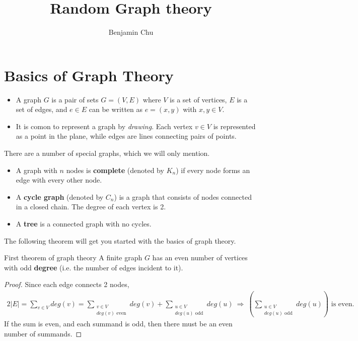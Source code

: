 \documentclass[./some_latex_template.tex]{subfiles}
\begin{document}
\title{Random Graph theory}
\author{Benjamin Chu}
\maketitle

\singlespacing

\section{Basics of Graph Theory}

\begin{itemize}
	\item A graph $G$ is a pair of sets $G = (V, E)$ where $V$ is a set of vertices, $E$ is a set of edges, and $e \in E$ can be written as $e = (x, y)$ with $x, y \in V$. 
	\item It is comon to represent a graph by \textit{drawing}. Each vertex $v \in V$ is represented as a point in the plane, while edges are lines connecting pairs of points. 
\end{itemize}

\noindent There are a number of special graphs, which we will only mention. 
\begin{itemize}
	\item A graph with $n$ nodes is \textbf{complete} (denoted by $K_n$) if every node forms an edge with every other node. 
	\item A \textbf{cycle graph} (denoted by $C_n$) is a graph that consists of nodes connected in a closed chain. The degree of each vertex is 2. 
	\item A \textbf{tree} is a connected graph with no cycles. 
\end{itemize}

\noindent The following theorem will get you started with the basics of graph theory.

\begin{theorembox}{First theorem of graph theory}{}
A finite graph $G$ has an even number of vertices with odd \textbf{degree} (i.e. the number of edges incident to it).
\end{theorembox}

\begin{proof}
Since each edge connects 2 nodes, 
\begin{align*}
	2|E| = 	\sum_{v \in V} deg(v) = \sum_{\substack{v \in V\\ deg(v) \text{ even}}} deg(v) + \sum_{\substack{u \in V\\ deg(u) \text{ odd}}} deg(u) \ \Longrightarrow \ \left(\sum_{\substack{u \in V\\ deg(u) \text{ odd}}} deg(u)\right) \text{ is even.}
\end{align*}
If the sum is even, and each summand is odd, then there must be an even number of summands.
\end{proof}
\end{document}

